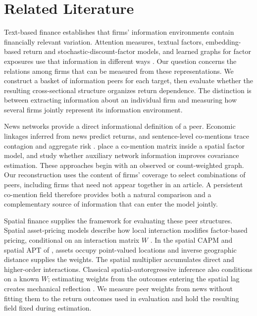 \section{Related Literature}\label{sec:literature}

Text-based finance establishes that firms' information environments contain
financially relevant variation.
Attention measures, textual factors, embedding-based return and
stochastic-discount-factor models, and learned graphs for factor exposures
use that information in different ways
\citep{ben_rephael_information_consumption_2019,cong_textual_factors_2024,
wang2025newsnet,son2022graph,uddin2024network}.
Our question concerns the relations among firms that can be measured from
these representations.
We construct a basket of information peers for each target, then evaluate
whether the resulting cross-sectional structure organizes return dependence.
The distinction is between extracting information about an individual firm
and measuring how several firms jointly represent its information environment.

News networks provide a direct informational definition of a peer.
Economic linkages inferred from news predict returns, and sentence-level
co-mentions trace contagion and aggregate risk
\citep{scherbina_economic_2013,schwenkler_network_2020}.
\citet{ge_news-implied_2023} place a co-mention matrix inside a spatial factor
model, and \citet{ge_network_guided_covariance_2026} study whether auxiliary
network information improves covariance estimation.
These approaches begin with an observed or count-weighted graph.
Our reconstruction uses the content of firms' coverage to select combinations
of peers, including firms that need not appear together in an article.
A persistent co-mention field therefore provides both a natural comparison
and a complementary source of information that can enter the model jointly.

Spatial finance supplies the framework for evaluating these peer structures.
Spatial asset-pricing models describe how local interaction modifies
factor-based pricing, conditional on an interaction matrix $W$
\citep{fernandez_spatial_2011,kou_asset_2018,ge_news-implied_2023}.
In the spatial CAPM and spatial APT of \citet{kou_asset_2018}, assets occupy
point-valued locations and inverse geographic distance supplies the weights.
The spatial multiplier accumulates direct and higher-order interactions.
Classical spatial-autoregressive inference also conditions on a known $W$;
estimating weights from the outcomes entering the spatial lag creates
mechanical reflection \citep{anselin_1988,lesage_pace_2009,kelejian_prucha_2010}.
We measure peer weights from news without fitting them to the return outcomes
used in evaluation and hold the resulting field fixed during estimation.

